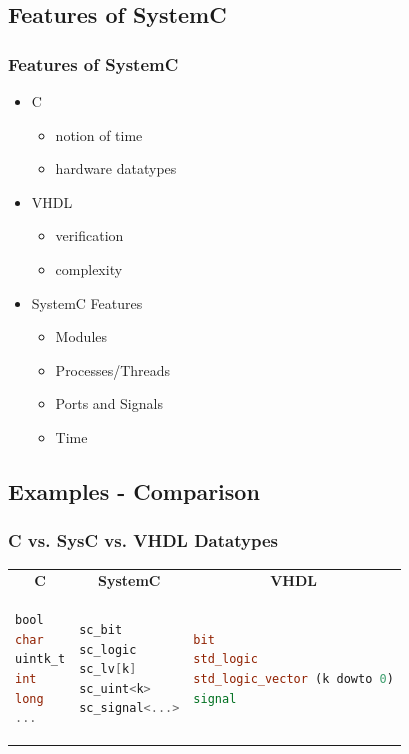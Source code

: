 \documentclass{beamer}
\begin{document}
\subsection{Features of SystemC}
\begin{frame} \frametitle{Features of SystemC} 
  \begin{itemize}
   \item C
    \begin{itemize}
      \item{notion of time}
      \item{hardware datatypes}
    \end{itemize}
   \item VHDL
    \begin{itemize}
      \item{verification}
      \item{complexity}
    \end{itemize}
   \item SystemC Features
    \begin{itemize}
      \item{Modules}
      \item{Processes/Threads}    
      \item{Ports and Signals}
      \item{Time}
    \end{itemize}
  \end{itemize}
\end{frame}

\subsection{Examples - Comparison}
\begin{frame}[fragile] \frametitle{C vs. SysC vs. VHDL Datatypes} 
\begin{tabular}{p{}|p{}|p{}}
\multicolumn{1}{c}{\textbf{C}} & \multicolumn{1}{c}{\textbf{SystemC}} & \multicolumn{1}{c}{\textbf{VHDL}} \\
\begin{lstlisting}[language=C]
bool
char
uintk_t
int 
long
...
\end{lstlisting}
& 
\begin{lstlisting}[language=C++, ]
sc_bit
sc_logic
sc_lv[k]
sc_uint<k>
sc_signal<...>
\end{lstlisting}
 &  
\begin{lstlisting}[language=VHDL]
bit
std_logic
std_logic_vector (k dowto 0)
signal
\end{lstlisting}
\end{tabular}

\end{frame}
\end{document}
